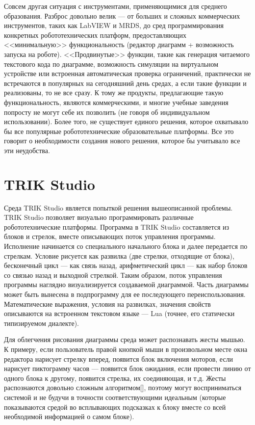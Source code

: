\documentclass[a5paper]{article}
\begin{document}
Совсем другая ситуация с инструментами, применяющимися для среднего образования. Разброс довольно велик --- 
от больших и сложных коммерческих инструментов, таких как LabVIEW и MRDS, до сред программирования конкретных 
робототехнических платформ, предоставляющих <<минимальную>> функциональность (редактор диаграмм + 
возможность запуска на роботе). <<Продвинутые>> функции, такие как генерация читаемого текстового 
кода по диаграмме, возможность симуляции на виртуальном устройстве или встроенная автоматическая 
проверка ограничений, практически не встречаются в популярных на сегодняшний день средах, а если такие 
функции и реализованы, то не все сразу. К тому же продукты, предлагающие такую функциональность, являются 
коммерческими, и многие учебные заведения попросту не могут себе их позволить (не говоря об индивидуальном 
использовании). Более того, не существует единого решения, которое охватывало бы все популярные 
робототехнические образовательные платформы. Все это говорит о необходимости создания нового решения, 
которое бы учитывало все эти неудобства.

\section{TRIK Studio}

Среда TRIK Studio является попыткой решения вышеописанной проблемы. TRIK Studio позволяет визуально программировать 
различные робототехнические платформы. Программа в TRIK Studio составляется из блоков и стрелок, вместе описывающих 
поток управления программы. Исполнение начинается со специального начального блока и далее передается по стрелкам. 
Условие рисуется как развилка (две стрелки, отходящие от блока), бесконечный цикл --- как связь назад, арифметический 
цикл --- как набор блоков со связью назад и выходной стрелкой. Таким образом, поток управления программы наглядно 
визуализируется создаваемой диаграммой. Часть диаграммы может быть вынесена в подпрограмму для ее последующего 
переиспользования. Математические выражения, условия на развилках, значения свойств описываются на встроенном 
текстовом языке --- Lua (точнее, его статически типизируемом диалекте).

Для облегчения рисования диаграммы среда может распознавать жесты мышью. К примеру, если пользователь правой 
кнопкой мыши в произвольном месте окна редактора нарисует стрелку вперед, появится блок включения моторов, если 
нарисует пиктограмму часов --- появится блок ожидания, если провести линию от одного блока к другому, появится 
стрелка, их соединяющая, и т.д. Жесты распознаются довольно сложным алгоритмом[], поэтому могут восприниматься 
системой и не будучи в точности соответствующими идеальным (которые показываются средой во всплывающих подсказках 
к блоку вместе со всей необходимой информацией о самом блоке).
\end{document}
